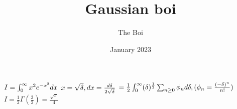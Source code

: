 \documentclass{article}
\title{Gaussian boi}
\author{The Boi}
\date{January 2023}
\begin{document}
\maketitle

$I = \int_{0}^{\infty}x^2e^{-x^2}dx\\$
$x = \sqrt{\delta}, dx = \frac{d \delta}{2\sqrt{\delta}}\\$
$=\frac{1}{2}\int_{0}^{\infty}(\delta)^{\frac{1}{2}} \sum_{n\ge0} \phi _n d \delta, (\phi _n = \frac{(-  \delta)^n}{n!})\\$
$ I = \frac{1}{2}\Gamma (\frac{3}{2}) = \frac{\sqrt{\pi}}{4}$
\end{document}
